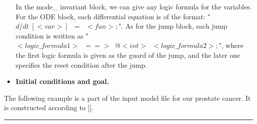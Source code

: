 \documentclass[runningheads,a4paper]{llncs}
\begin{document}
\begin{itemize}
In the mode\_ invariant block, we can give any logic formula for the variables. For the ODE block, each differential equation is of the format: "$d/dt \; [<var>]\;\;=\;\;<fun>;$". As for the jump block, each jump condition is written as "$<logic\_formula1> \;\; ==> \;\; @<int>\;\;<logic\_formula2>;$", where the first logic formula is given as the guard of the jump, and the later one specifies the reset condition after the jump.\\

\item {\bf Initial conditions and goal.}



\end{itemize}

\begin{example}
The following example is a part of the input model file for our prostate cancer. It is constructed according to [].\\
\noindent\rule{\textwidth}{0.7pt}


\end{example}
\end{document}
